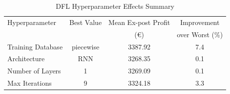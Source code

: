 \begin{table}[h]
\centering
\caption{DFL Hyperparameter Effects Summary}
\label{tab:dfl_hyperparameter_effects}
\begin{tabular}{lccc}
\toprule
Hyperparameter & Best Value & Mean Ex-post Profit & Improvement \\
 & & (€) & over Worst (\%) \\
\midrule
Training Database & piecewise & 3387.92 & 7.4 \\
Architecture & RNN & 3268.35 & 0.1 \\
Number of Layers & 1 & 3269.09 & 0.1 \\
Max Iterations & 9 & 3324.18 & 3.3 \\
\bottomrule
\end{tabular}
\end{table}
